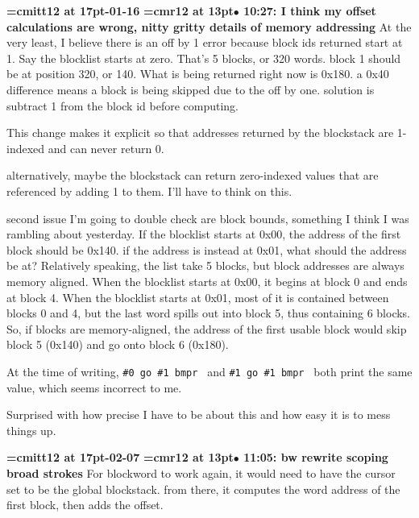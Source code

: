{\medskip\noindent\bf\font\titlefont=cmitt12 at 17pt-01-16}\medskip
{\smallskip\noindent\bf\font\titlefont=cmr12 at 13pt\titlefont $\bullet$ 10:27: I think my offset calculations are wrong, nitty gritty details of memory addressing}\smallskip
At the very least, I believe there is an off by 1 error because block ids returned start at 1. Say the blocklist starts at zero. That's 5 blocks, or 320 words. block 1 should be at position 320, or 140. What is being returned right now is 0x180. a 0x40 difference means a block is being skipped due to the off by one. solution is subtract 1 from the block id before computing.
\par

This change makes it explicit so that addresses returned by the blockstack are 1-indexed and can never return 0.
\par

alternatively, maybe the blockstack can return zero-indexed values that are referenced by adding 1 to them. I'll have to think on this.
\par

second issue I'm going to double check are block bounds, something I think I was rambling about yesterday. If the blocklist starts at 0x00, the address of the first block should be 0x140. if the address is instead at 0x01, what should the address be at? Relatively speaking, the list take 5 blocks, but block addresses are always memory aligned. When the blocklist starts at 0x00, it begins at block 0 and ends at block 4. When the blocklist starts at 0x01, most of it is contained between blocks 0 and 4, but the last word spills out into block 5, thus containing 6 blocks. So, if blocks are memory-aligned, the address of the first usable block would skip block 5 (0x140) and go onto block 6 (0x180).
\par

At the time of writing, {\tt \#0 go \#1 bmpr } and {\tt \#1 go \#1 bmpr } both print the same value, which seems incorrect to me.
\par

Surprised with how precise I have to be about this and how easy it is to mess things up.
\par

{\medskip\noindent\bf\font\titlefont=cmitt12 at 17pt-02-07}\medskip
{\smallskip\noindent\bf\font\titlefont=cmr12 at 13pt\titlefont $\bullet$ 11:05: bw rewrite scoping broad strokes}\smallskip
For blockword to work again, it would need to have the cursor set to be the global blockstack. from there, it computes the word address of the first block, then adds the offset.
\par

